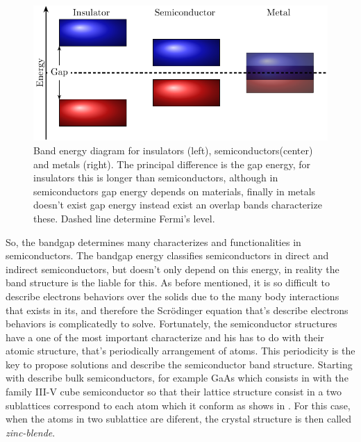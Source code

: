 \begin{figure}[h!]
	\centering
	\includegraphics[width=\linewidth]{../figures/chapter-1/solid-sort/build/solid-sort}
	\caption{Band energy diagram for insulators (left), semiconductors(center) and metals (right). The principal difference is the gap energy, for insulators this is longer than semiconductors, although in semiconductors gap energy depends on materials, finally in metals doesn't exist gap energy instead exist an overlap bands characterize these. Dashed line determine Fermi's level.  }
	\label{fig:subsubsection-1.1.1-solid-types}
\end{figure}

So, the bandgap determines many characterizes and functionalities in semiconductors. The bandgap energy classifies semiconductors in direct and indirect semiconductors, but doesn't only depend on this energy, in reality the band structure is the liable for this. As before mentioned, it is so difficult to describe electrons behaviors over the solids due to the many body interactions that exists in its, and therefore the Scr\"odinger equation that's describe electrons behaviors is complicatedly to solve.  Fortunately, the semiconductor structures have a one of the most important characterize  and his has to do with their atomic structure,  that's periodically arrangement of atoms.
This periodicity is the key to propose solutions and describe the semiconductor band structure. 
Starting with describe bulk semiconductors, for example GaAs which consists in with the family III-V cube semiconductor so that their lattice structure consist in a two sublattices correspond to each atom which it conform as shows in . For this case, when the atoms in two sublattice are diferent, the crystal structure is then called \emph{zinc-blende}\cite{vurgaftman2020bands}.

